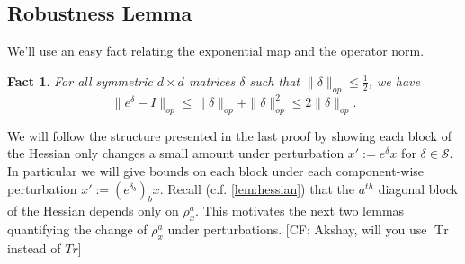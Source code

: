\documentclass[aos]{imsart}
\newtheorem{corollary}[theorem]{Corollary}
\newtheorem{fact}[theorem]{Fact}
\theoremstyle{definition}
\DeclareMathOperator{\tr}{Tr}
\newcommand{\R}{{\mathbb{R}}}
\newcommand{\Sym}{\mathcal{S}}
\newcommand{\samp}{x}
\newcommand{\CF}[1]{{\color{purple}[CF: #1]}}
\begin{document}
\begin{appendix}


\section{Robustness Lemma}
We'll use an easy fact relating the exponential map and the operator norm.

\begin{fact} For all symmetric $d\times d$ matrices $\delta $ such that $ \|\delta\|_{op} \leq \frac{1}{2}$, we have
$$ \|e^{\delta} - I\|_{op} \leq \|\delta\|_{op} + \|\delta\|_{op}^{2} \leq 2 \|\delta\|_{op}.$$
\end{fact}

We will follow the structure presented in the last proof %
by showing each block of the Hessian only changes a small amount under perturbation $x' := e^{\delta} x$ for $\delta \in \Sym$. In particular we will give bounds on each block under each component-wise perturbation $x' := (e^{\delta_{b}})_{b} x$. Recall (c.f. \cref{lem:hessian}) that the $a^{th}$ diagonal block of the Hessian depends only on $\rho^a_{\samp}$. This motivates the next two lemmas quantifying the change of $\rho^{a}
_{\samp}$ under perturbations. \CF{Akshay, will you use $\tr$ instead of $Tr$}



\end{appendix}
\end{document}
